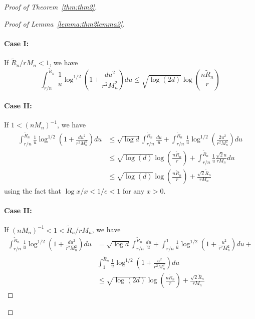 \documentclass[11pt,letterpaper]{article}
\numberwithin{equation}{section}
\begin{document}
\begin{proof}[Proof of Theorem~\ref{thm:thm2}]
\begin{proof}[Proof of Lemma~\ref{lemma:thm2lemma2}]
\paragraph{Case I:} If $\tilde R_n/r M_n < 1$, we have
%
$$
\int_{r/n}^{\tilde R_n} \frac{1}{u} \log^{1/2} \left( 1 + \frac{ d u^2}{r^2 M_n^2} \right) du \leq
\sqrt{\log (2d)} \log \left( \frac{n \tilde R_n}{r} \right)
$$

\paragraph{Case II:} If $1 < (nM_n)^{-1}$, we have
%
\begin{align*}
\int_{r/n}^{\tilde R_n} \frac{1}{u} \log^{1/2} \left( 1 + \frac{ d u^2}{r^2 M_n^2} \right) du
& \leq \sqrt{\log d} \int_{r/n}^{\tilde R_n} \frac{du}{u} +
\int_{r/n}^{\tilde R_n} \frac{1}{u} \log^{1/2} \left( \frac{2 u^2}{r^2 M_n^2} \right) du \\
& \leq \sqrt{\log (d)} \log \left( \frac{n \tilde R_n}{r} \right) +
\int_{r/n}^{\tilde R_n} \frac{1}{u} \frac{\sqrt 2 u}{r M_n} du \\
& \leq \sqrt{\log (d)} \log \left( \frac{n \tilde R_n}{r} \right) + \frac{\sqrt 2 \tilde R_n}{r M_n}
\end{align*}
%
using the fact that $\log x/x < 1/e < 1$ for any $x>0$.

\paragraph{Case II:} If $(nM_n)^{-1} < 1 < \tilde R_n/r M_n$, we have
%
\begin{align*}
\int_{r/n}^{\tilde R_n} \frac{1}{u} \log^{1/2} \left( 1 + \frac{ d u^2}{r^2 M_n^2} \right) du &=
\sqrt{\log d} \int_{r/n}^{\tilde R_n} \frac{du}{u} +
\int_{r/n}^{1} \frac{1}{u} \log^{1/2} \left( 1 + \frac{u^2}{r^2 M_n^2} \right) du +\\
& \int_{1}^{\tilde R_n} \frac{1}{u} \log^{1/2} \left( 1 + \frac{u^2}{r^2 M_n^2} \right) du \\
& \leq \sqrt{\log (2d)} \log \left( \frac{n \tilde R_n}{r} \right) + \frac{\sqrt 2 \tilde R_n}{r M_n}
\end{align*}
%


\end{proof}
\end{proof}
\end{document}
